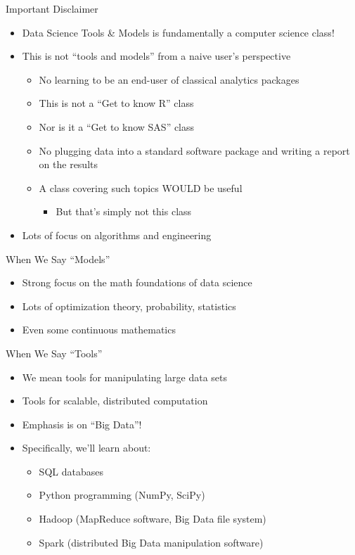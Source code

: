 \documentclass[aspectratio=169]{beamer}
\begin{document}
\begin{frame}{Important Disclaimer}
\begin{itemize}
\item Data Science Tools \& Models is fundamentally a computer science class!
\item This is not ``tools and models'' from a naive user's perspective
	\begin{itemize}
	\item No learning to be an end-user of classical analytics packages
	\item This is not a ``Get to know R'' class
	\item Nor is it a ``Get to know SAS'' class
	\item No plugging data into a standard software package and writing a report on the results
	\item A class covering such topics WOULD be useful
	\begin{itemize}
		\item But that's simply not this class
	\end{itemize}
	\end{itemize}
\item Lots of focus on algorithms and engineering

    \end{itemize}

\end{frame}


\begin{frame}{When We Say ``Models''} 
   \begin{itemize}
	\item Strong focus on the math foundations of data science
	\item Lots of optimization theory, probability, statistics
	\item Even some continuous mathematics
    \end{itemize}
\end{frame}


\begin{frame}{When We Say ``Tools''}
    \begin{itemize}
\item We mean tools for manipulating large data sets
\item Tools for scalable, distributed computation
\item Emphasis is on ``Big Data''!
\item Specifically, we'll learn about:
	\begin{itemize}
	\item SQL databases
	\item Python programming (NumPy, SciPy)
	\item Hadoop (MapReduce software, Big Data file system)
	\item Spark (distributed Big Data manipulation software)
	\end{itemize}
    \end{itemize}
\end{frame}
\end{document}
